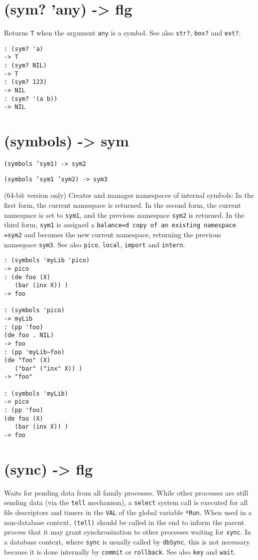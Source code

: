 {{{{{{{{ 
\section{(sym? 'any) -> flg}
\label{sec-8-1-19-47}


Returns \texttt{T} when the argument \texttt{any} is a symbol. See also \texttt{str?}, \texttt{box?}
and \texttt{ext?}.


\begin{verbatim}
: (sym? 'a)
-> T
: (sym? NIL)
-> T
: (sym? 123)
-> NIL
: (sym? '(a b))
-> NIL
\end{verbatim}

 
\section{(symbols) -> sym}
\label{sec-8-1-19-48}


\texttt{(symbols 'sym1) -> sym2}

\texttt{(symbols 'sym1 'sym2) -> sym3}

(64-bit version only) Creates and manages namespaces of internal
symbols: In the first form, the current namespace is returned. In the
second form, the current namespace is set to \texttt{sym1}, and the previous
namespace \texttt{sym2} is returned. In the third form, \texttt{sym1} is assigned a
\texttt{balance=d copy of an existing namespace =sym2} and becomes the new
current namespace, returning the previous namespace \texttt{sym3}. See also
\texttt{pico}, \texttt{local}, \texttt{import} and \texttt{intern}.


\begin{verbatim}
: (symbols 'myLib 'pico)
-> pico
: (de foo (X)
   (bar (inx X)) )
-> foo

: (symbols 'pico)
-> myLib
: (pp 'foo)
(de foo . NIL)
-> foo
: (pp 'myLib~foo)
(de "foo" (X)
   ("bar" ("inx" X)) )
-> "foo"

: (symbols 'myLib)
-> pico
: (pp 'foo)
(de foo (X)
   (bar (inx X)) )
-> foo
\end{verbatim}

 
\section{(sync) -> flg}
\label{sec-8-1-19-49}


Waits for pending data from all family processes. While other processes
are still sending data (via the \texttt{tell} mechanism), a \texttt{select} system
call is executed for all file descriptors and timers in the \texttt{VAL} of the
global variable \texttt{*Run}. When used in a non-database context, \texttt{(tell)}
should be called in the end to inform the parent process that it may
grant synchronization to other processes waiting for \texttt{sync}. In a
database context, where \texttt{sync} is usually called by \texttt{dbSync}, this is
not necessary because it is done internally by \texttt{commit} or \texttt{rollback}.
See also \texttt{key} and \texttt{wait}.


}}}}}}}}
